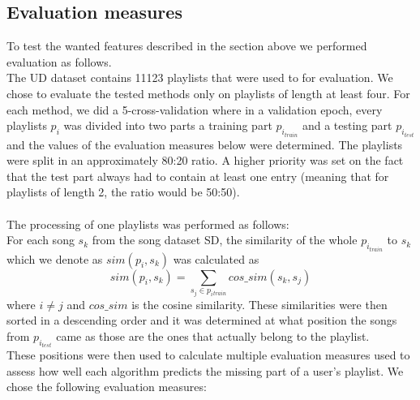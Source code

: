 \subsection{Evaluation measures}\label{ssec:evaluation_measures}
To test the wanted features described in the section above we performed evaluation as follows. \\
The UD dataset contains 11123 playlists that were used to for evaluation. We chose to evaluate the tested methods only on playlists of length at least four. For each method, we did a 5-cross-validation where in a validation epoch, every playlists $p_i$ was divided into two parts a training part $p_{i_{train}}$ and a testing part $p_{i_{test}}$ and the values of the evaluation measures below were determined. The playlists were split in an approximately 80:20 ratio. A higher priority was set on the fact that the test part always had to contain at least one entry (meaning that for playlists of length 2, the ratio would be 50:50). \\ \\
The processing of one playlists was performed as follows: \\
For each song $ s_k $ from the song dataset SD, the similarity of the whole $p_{i_{train}}$ to $s_k$ which we denote as $ sim(p_i, s_k) $ was calculated as $$ sim(p_i, s_k) =\sum_{s_j\in{p_i{_{train}}}} cos\_sim(s_k, s_j) $$ where $ i \neq j$ and $cos\_sim$ is the cosine similarity. These similarities were then sorted in a descending order and it was determined at what position the songs from $p_{i_{test}} $ came as those are the ones that actually belong to the playlist. \\
These positions were then used to calculate multiple evaluation measures used to assess how well each algorithm predicts the missing part of a user's playlist. We chose the following evaluation measures:
